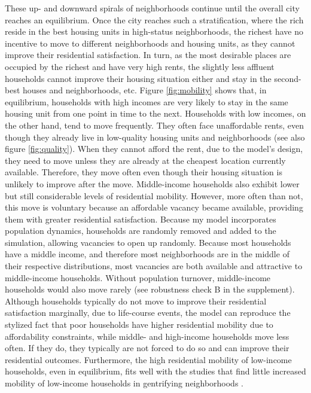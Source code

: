 \documentclass[a4paper,12pt]{article}
\begin{document}
These up- and downward spirals of neighborhoods continue until the overall city reaches an equilibrium. Once the city reaches such a stratification, where the rich reside in the best housing units in high-status neighborhoods, the richest have no incentive to move to different neighborhoods and housing units, as they cannot improve their residential satisfaction. In turn, as the most desirable places are occupied by the richest and have very high rents, the slightly less affluent households cannot improve their housing situation either and stay in the second-best houses and neighborhoods, etc. Figure \ref{fig:mobility} shows that, in equilibrium, households with high incomes are very likely to stay in the same housing unit from one point in time to the next. Households with low incomes, on the other hand, tend to move frequently. They often face unaffordable rents, even though they already live in low-quality housing units and neighborhoods (see also figure \ref{fig:quality}). When they cannot afford the rent, due to the model's design, they need to move unless they are already at the cheapest location currently available. Therefore, they move often even though their housing situation is unlikely to improve after the move. Middle-income households also exhibit lower but still considerable levels of residential mobility. However, more often than not, this move is voluntary because an affordable vacancy became available, providing them with greater residential satisfaction. Because my model incorporates population dynamics, households are randomly removed and added to the simulation, allowing vacancies to open up randomly. Because most households have a middle income, and therefore most neighborhoods are in the middle of their respective distributions, most vacancies are both available and attractive to middle-income households. Without population turnover, middle-income households would also move rarely (see robustness check B in the supplement). Although households typically do not move to improve their residential satisfaction marginally, due to life-course events, the model can reproduce the stylized fact that poor households have higher residential mobility due to affordability constraints, while middle- and high-income households move less often. If they do, they typically are not forced to do so and can improve their residential outcomes. Furthermore, the high residential mobility of low-income households, even in equilibrium, fits well with the studies that find little increased mobility of low-income households in gentrifying neighborhoods \citep{freemanDisplacementSuccessionResidential2005, dingGentrificationResidentialMobility2016, leeGeographyGentrificationResidential2023}.
\end{document}
